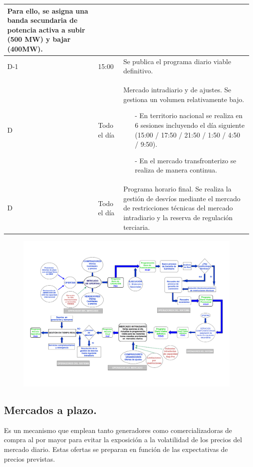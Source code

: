 \begin{table}[H]
\begin{tabular}{p{2cm}|p{2cm}|p{8cm}}
		Para ello, se asigna una banda secundaria de potencia activa a subir (500 MW) y bajar (400MW).
		\\\hline
		D-1 & 15:00 &  Se publica el programa diario viable definitivo.\\\hline
		D & Todo el día & Mercado intradiario y de ajustes. Se gestiona un volumen relativamente bajo.
	\begin{itemize}
		\item [-] 	En territorio nacional se realiza en 6 sesiones incluyendo el día siguiente (15:00 / 17:50 / 21:50 / 1:50 / 4:50 / 9:50).
		\item [-] En el mercado transfronterizo se realiza de manera continua.
	\end{itemize}
		\\\hline
		D & Todo el día & Programa horario final. Se realiza la gestión de desvíos mediante el mercado de restricciones técnicas del mercado intradiario y la reserva de regulación terciaria. \\\hline
	\end{tabular}
\end{table}
\newpage
\begin{landscape}
\begin{figure}
	\centering
	\includegraphics[width=1\linewidth]{res/tema4/funcionamientoMercado}
	\label{fig:funcionamientomercado}
\end{figure}
\end{landscape}
\newpage
\subsection{Mercados a plazo.}
Es un mecanismo que emplean tanto generadores como comercializadoras de compra al por mayor para evitar la exposición a la volatilidad de los precios del mercado diario. Estas ofertas se preparan en función de las expectativas de precios previstas.




